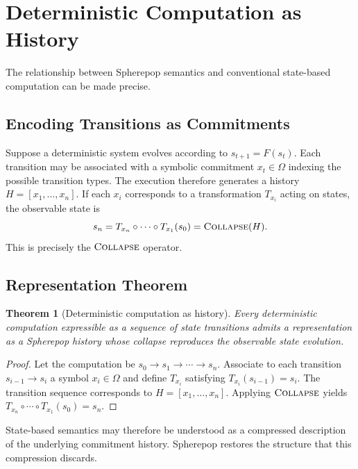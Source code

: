 \documentclass[12pt]{article}
\newtheorem{theorem}{Theorem}[section]
\newcommand{\Collapse}{\operatorname{\textsc{Collapse}}}
\newcommand{\Option}{\Omega}
\newcommand{\Seq}[1]{\left[#1\right]}
\begin{document}
\section{Deterministic Computation as History}
\label{sec:deterministic}

The relationship between Spherepop semantics and conventional state-based computation can be made precise.

\subsection{Encoding Transitions as Commitments}

Suppose a deterministic system evolves according to $s_{t+1} = F(s_t)$. Each transition may be associated with a symbolic commitment $x_t \in \Option$ indexing the possible transition types. The execution therefore generates a history $H = \Seq{x_1,\ldots,x_n}$. If each $x_i$ corresponds to a transformation $T_{x_i}$ acting on states, the observable state is
\[
s_n = T_{x_n} \circ \cdots \circ T_{x_1}(s_0) = \Collapse(H).
\]
This is precisely the $\Collapse$ operator.

\subsection{Representation Theorem}

\begin{theorem}[Deterministic computation as history]
Every deterministic computation expressible as a sequence of state transitions admits a representation as a Spherepop history whose collapse reproduces the observable state evolution.
\end{theorem}

\begin{proof}
Let the computation be $s_0 \to s_1 \to \cdots \to s_n$. Associate to each transition $s_{i-1} \to s_i$ a symbol $x_i \in \Option$ and define $T_{x_i}$ satisfying $T_{x_i}(s_{i-1}) = s_i$. The transition sequence corresponds to $H = \Seq{x_1,\ldots,x_n}$. Applying $\Collapse$ yields $T_{x_n} \circ \cdots \circ T_{x_1}(s_0) = s_n$.
\end{proof}

State-based semantics may therefore be understood as a compressed description of the underlying commitment history. Spherepop restores the structure that this compression discards.
\end{document}

